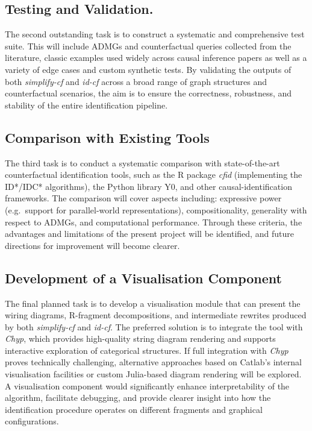 \documentclass[12pt,a4paper]{article}
\begin{document}
\subsection{Testing and Validation.}
The second outstanding task is to construct a systematic and comprehensive test suite. This will include ADMGs and counterfactual queries collected from the literature, classic examples used widely across causal inference papers as well as a variety of edge cases and custom synthetic tests. By validating the outputs of both \textit{simplify-cf} and \textit{id-cf} across a broad range of graph structures and counterfactual scenarios, the aim is to ensure the correctness, robustness, and stability of the entire identification pipeline.

\subsection{Comparison with Existing Tools}
The third task is to conduct a systematic comparison with state-of-the-art counterfactual identification tools, such as the R package \textit{cfid} (implementing the ID*/IDC* algorithms), the Python library Y0, and other causal-identification frameworks. The comparison will cover aspects including: expressive power (e.g.\ support for parallel-world 
representations), compositionality, generality with respect to ADMGs, and computational performance. Through these criteria, the advantages and limitations of the present project will be identified, and future directions for improvement will become clearer.

\subsection{Development of a Visualisation Component}
The final planned task is to develop a visualisation module that can present the wiring diagrams, R-fragment decompositions, and intermediate rewrites produced by both \textit{simplify-cf} and \textit{id-cf}. The preferred solution is to integrate the tool with \textit{Chyp}, which provides high-quality string diagram rendering and supports interactive exploration of categorical structures. If full integration with \textit{Chyp} proves technically challenging, alternative approaches based on Catlab's internal visualisation facilities or custom Julia-based diagram rendering will be explored. A visualisation component would significantly enhance interpretability of the algorithm, facilitate debugging, and provide clearer insight into how the identification procedure operates on different fragments and graphical configurations.


\end{document}

